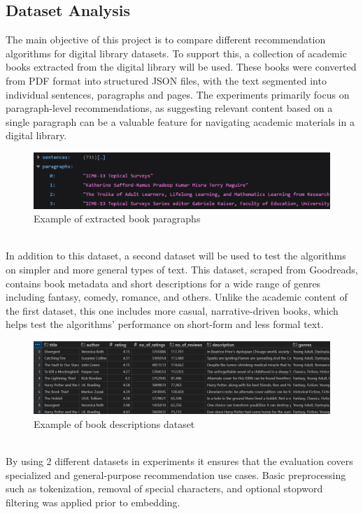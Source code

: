 \documentclass[\myFontSize,oneside,english,hidelinks,a4paper]{article}
\begin{document}
%
%

\subsection{Dataset Analysis}
The main objective of this project is to compare different recommendation algorithms for digital library datasets. To support this, a collection of academic books extracted from the digital library will be used. These books were converted from PDF format into structured JSON files, with the text segmented into individual sentences, paragraphs and pages. The experiments primarily focus on paragraph-level recommendations, as suggesting relevant content based on a single paragraph can be a valuable feature for navigating academic materials in a digital library.
%
\begin{figure}[h!]
    \centering
    \includegraphics[width=1\textwidth]{img/json_example2.png}
    \caption{Example of extracted book paragraphs}
    \label{fig:extracted_paragraph_example}
\end{figure}\\
%
In addition to this dataset, a second dataset will be used to test the algorithms on simpler and more general types of text. This dataset, scraped from Goodreads, contains book metadata and short descriptions for a wide range of genres including fantasy, comedy, romance, and others. Unlike the academic content of the first dataset, this one includes more casual, narrative-driven books, which helps test the algorithms’ performance on short-form and less formal text.
%
\begin{figure}[h!]
    \centering
    \includegraphics[width=1\textwidth]{img/rating_data_example2.png}
    \caption{Example of book descriptions dataset \cite{goodreads_kumar_2022}}
    \label{fig:book_description_dataset_example}
\end{figure}\\
%
By using 2 different datasets in experiments it ensures that the evaluation covers specialized and general-purpose recommendation use cases. Basic preprocessing such as tokenization, removal of special characters, and optional stopword filtering was applied prior to embedding.\\
%
%
%
\end{document}

